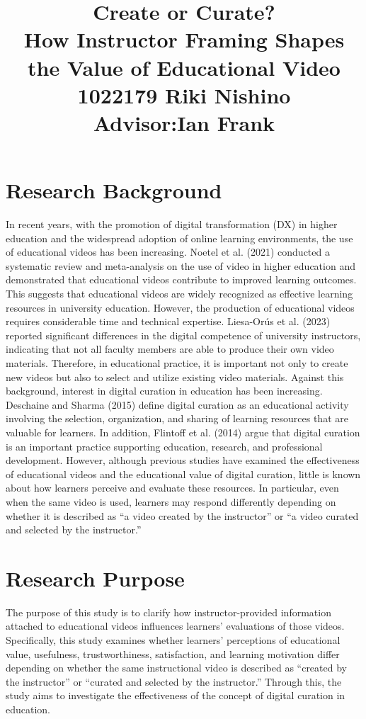\documentclass[a4paper,11pt]{article}
\title{Create or Curate?\\ How Instructor Framing Shapes the Value of Educational Video\\
\large  1022179 Riki Nishino\\
Advisor:Ian Frank}
\author{}
\date{}
\begin{document}
\maketitle

\section{Research Background}

In recent years, with the promotion of digital transformation (DX) in higher education and the widespread adoption of online learning environments, the use of educational videos has been increasing. Noetel et al. (2021) conducted a systematic review and meta-analysis on the use of video in higher education and demonstrated that educational videos contribute to improved learning outcomes. This suggests that educational videos are widely recognized as effective learning resources in university education.
However, the production of educational videos requires considerable time and technical expertise. Liesa-Orús et al. (2023) reported significant differences in the digital competence of university instructors, indicating that not all faculty members are able to produce their own video materials. Therefore, in educational practice, it is important not only to create new videos but also to select and utilize existing video materials.
Against this background, interest in digital curation in education has been increasing. Deschaine and Sharma (2015) define digital curation as an educational activity involving the selection, organization, and sharing of learning resources that are valuable for learners. In addition, Flintoff et al. (2014) argue that digital curation is an important practice supporting education, research, and professional development.
However, although previous studies have examined the effectiveness of educational videos and the educational value of digital curation, little is known about how learners perceive and evaluate these resources. In particular, even when the same video is used, learners may respond differently depending on whether it is described as “a video created by the instructor” or “a video curated and selected by the instructor.”

\section{Research Purpose}

The purpose of this study is to clarify how instructor-provided information attached to educational videos influences learners’ evaluations of those videos.
Specifically, this study examines whether learners’ perceptions of educational value, usefulness, trustworthiness, satisfaction, and learning motivation differ depending on whether the same instructional video is described as “created by the instructor” or “curated and selected by the instructor.”
Through this, the study aims to investigate the effectiveness of the concept of digital curation in education.
\end{document}
